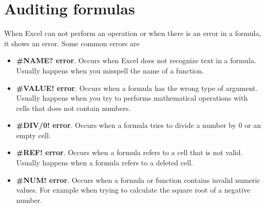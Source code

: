 % 
% 
% 
% 

\section{Auditing formulas}\hypertarget{auditing-formulas}{}\label{auditing-formulas}

When Excel can not perform an operation or when there is an error in a formula, it shows an error. Some common errors are

\begin{itemize}
\item \textbf{\#NAME? error}. Occurs when Excel does not recognize text in a formula. Usually happens when you misspell the name of a function.
\item \textbf{\#VALUE! error}. Occurs when a formula has the wrong type of argument. Usually happens when you try to performs mathematical operations with cells that does not contain numbers.
\item \textbf{\#DIV/0! error}. Occurs when a formula tries to divide a number by 0 or an empty cell.
\item \textbf{\#REF! error}. Occurs when a formula refers to a cell that is not valid. Usually happens when a formula refers to a deleted cell.
\item \textbf{\#NUM! error}. Occurs when a formula or function contains invalid numeric values. For example when trying to calculate the square root of a negative number.
\end{itemize}


